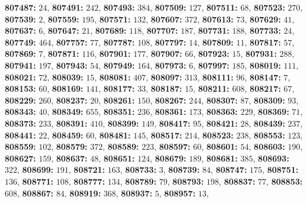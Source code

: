 \textsf{\bfseries 807487:} $24$, \textsf{\bfseries 807491:} $242$, \textsf{\bfseries 807493:} $384$, \textsf{\bfseries 807509:} $127$, \textsf{\bfseries 807511:} $68$, \textsf{\bfseries 807523:} $270$, \textsf{\bfseries 807539:} $2$, \textsf{\bfseries 807559:} $195$, \textsf{\bfseries 807571:} $132$, \textsf{\bfseries 807607:} $372$, \textsf{\bfseries 807613:} $73$, \textsf{\bfseries 807629:} $41$, \textsf{\bfseries 807637:} $6$, \textsf{\bfseries 807647:} $21$, \textsf{\bfseries 807689:} $118$, \textsf{\bfseries 807707:} $187$, \textsf{\bfseries 807731:} $188$, \textsf{\bfseries 807733:} $24$, \textsf{\bfseries 807749:} $464$, \textsf{\bfseries 807757:} $77$, \textsf{\bfseries 807787:} $108$, \textsf{\bfseries 807797:} $14$, \textsf{\bfseries 807809:} $11$, \textsf{\bfseries 807817:} $57$, \textsf{\bfseries 807869:} $7$, \textsf{\bfseries 807871:} $116$, \textsf{\bfseries 807901:} $177$, \textsf{\bfseries 807907:} $66$, \textsf{\bfseries 807923:} $15$, \textsf{\bfseries 807931:} $288$, \textsf{\bfseries 807941:} $197$, \textsf{\bfseries 807943:} $54$, \textsf{\bfseries 807949:} $164$, \textsf{\bfseries 807973:} $6$, \textsf{\bfseries 807997:} $185$, \textsf{\bfseries 808019:} $111$, \textsf{\bfseries 808021:} $72$, \textsf{\bfseries 808039:} $15$, \textsf{\bfseries 808081:} $407$, \textsf{\bfseries 808097:} $313$, \textsf{\bfseries 808111:} $96$, \textsf{\bfseries 808147:} $7$, \textsf{\bfseries 808153:} $60$, \textsf{\bfseries 808169:} $141$, \textsf{\bfseries 808177:} $33$, \textsf{\bfseries 808187:} $15$, \textsf{\bfseries 808211:} $608$, \textsf{\bfseries 808217:} $67$, \textsf{\bfseries 808229:} $260$, \textsf{\bfseries 808237:} $20$, \textsf{\bfseries 808261:} $150$, \textsf{\bfseries 808267:} $244$, \textsf{\bfseries 808307:} $87$, \textsf{\bfseries 808309:} $93$, \textsf{\bfseries 808343:} $40$, \textsf{\bfseries 808349:} $655$, \textsf{\bfseries 808351:} $236$, \textsf{\bfseries 808361:} $173$, \textsf{\bfseries 808363:} $229$, \textsf{\bfseries 808369:} $71$, \textsf{\bfseries 808373:} $233$, \textsf{\bfseries 808391:} $410$, \textsf{\bfseries 808399:} $149$, \textsf{\bfseries 808417:} $95$, \textsf{\bfseries 808421:} $28$, \textsf{\bfseries 808439:} $237$, \textsf{\bfseries 808441:} $22$, \textsf{\bfseries 808459:} $60$, \textsf{\bfseries 808481:} $145$, \textsf{\bfseries 808517:} $214$, \textsf{\bfseries 808523:} $238$, \textsf{\bfseries 808553:} $123$, \textsf{\bfseries 808559:} $102$, \textsf{\bfseries 808579:} $372$, \textsf{\bfseries 808589:} $223$, \textsf{\bfseries 808597:} $60$, \textsf{\bfseries 808601:} $54$, \textsf{\bfseries 808603:} $190$, \textsf{\bfseries 808627:} $159$, \textsf{\bfseries 808637:} $48$, \textsf{\bfseries 808651:} $124$, \textsf{\bfseries 808679:} $189$, \textsf{\bfseries 808681:} $385$, \textsf{\bfseries 808693:} $322$, \textsf{\bfseries 808699:} $191$, \textsf{\bfseries 808721:} $163$, \textsf{\bfseries 808733:} $3$, \textsf{\bfseries 808739:} $84$, \textsf{\bfseries 808747:} $175$, \textsf{\bfseries 808751:} $136$, \textsf{\bfseries 808771:} $108$, \textsf{\bfseries 808777:} $134$, \textsf{\bfseries 808789:} $79$, \textsf{\bfseries 808793:} $198$, \textsf{\bfseries 808837:} $77$, \textsf{\bfseries 808853:} $608$, \textsf{\bfseries 808867:} $84$, \textsf{\bfseries 808919:} $368$, \textsf{\bfseries 808937:} $5$, \textsf{\bfseries 808957:} $13$, 
